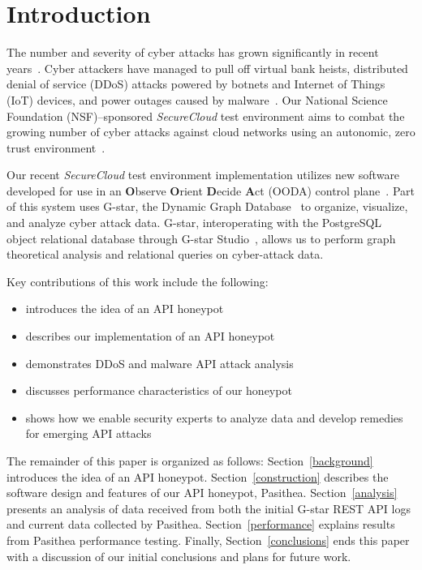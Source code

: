 
\section{Introduction} \label{intro}

The number and severity of cyber attacks has grown significantly in recent years~\cite{Symantec-Threat-Report,IBM-XForce-Report}. 
Cyber attackers have managed to pull off virtual bank heists, distributed denial of service (DDoS) attacks powered by botnets and Internet of Things (IoT) devices, and power outages caused by malware~\cite{IBM-XForce-Report}. 
Our National Science Foundation (NSF)--sponsored {\em SecureCloud} test environment aims to combat the growing number of cyber attacks against cloud networks using an autonomic, zero trust environment~\cite{7796146}.  

Our recent {\em SecureCloud} test environment implementation utilizes new software developed for use in an {\textbf O}bserve {\textbf O}rient {\textbf D}ecide {\textbf A}ct (OODA) control plane~\cite{something for OODA}.
Part of this system uses G-star, the Dynamic Graph Database~\cite{Labouseur-DAPD-2015} to organize, visualize, and analyze cyber attack data. 
G-star, interoperating with the PostgreSQL object relational database through G-star Studio~\cite{inroads-Labouseur16}, allows us to perform graph theoretical analysis and relational queries on cyber-attack data.  

Key contributions of this work include the following:
\begin{itemize}
      \setlength{\itemsep}{1pt}
      \setlength{\parskip}{0pt}
      \setlength{\parsep}{0pt}
   \item introduces the idea of an API honeypot
   \item describes our implementation of an API honeypot
   \item demonstrates DDoS and malware API attack analysis
   \item discusses performance characteristics of our honeypot
   \item shows how we enable security experts to analyze data and develop remedies for emerging API attacks  
\end{itemize}

The remainder of this paper is organized as follows: 
Section~\ref{background} introduces the idea of an API honeypot. 
Section~\ref{construction} describes the software design and features of our API honeypot, Pasithea. 
Section~\ref{analysis} presents an analysis of data received from both the initial G-star REST API logs and current data collected by Pasithea. 
Section~\ref{performance} explains results from Pasithea performance testing.
Finally, Section~\ref{conclusions} ends this paper with a discussion of our initial conclusions and plans for future work.
